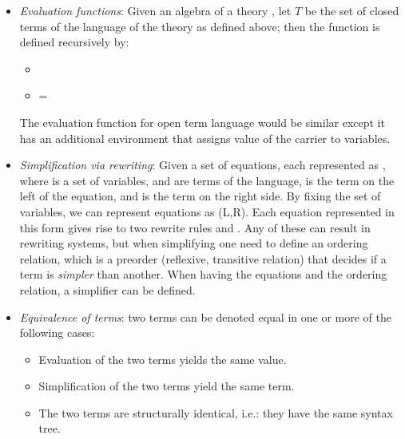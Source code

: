 \begin{itemize}
\begin{itemize}
    \end{itemize}     
    \item \emph{Evaluation functions}: Given an algebra  of a theory \lstmath{$\Gamma = (\sort,\fsyms,\equations$)}, let $T$ be the set of closed terms of the language of the theory as defined above; then the function  is defined recursively by:  
    \begin{itemize}
        \item {}
        \item {} =  
    \end{itemize}      
    The evaluation function for open term language would be similar except it has an additional environment that assigns value of the carrier to variables. 
    \item \emph{Simplification via rewriting}: Given a set of equations, each represented as , where  is a set of variables,  and  are terms of the language,  is the term on the left of the equation, and  is the term on the right side. By fixing the set of variables, we can represent equations as  (L,R). Each equation represented in this form gives rise to two rewrite rules  and . Any of these can result in rewriting systems, but when simplifying one need to define an ordering relation, which is a preorder (reflexive, transitive relation) that decides if a term is \emph{simpler} than another. When having the equations and the ordering relation, a simplifier can be defined. 
    \item \emph{Equivalence of terms}: two terms can be denoted equal in one or more of the following cases: 
    \begin{itemize}
        \item Evaluation of the two terms yields the same value. 
        \item Simplification of the two terms yield the same term. 
        \item The two terms are structurally identical, i.e.: they have the same syntax tree. 
    \end{itemize}
\end{itemize}


